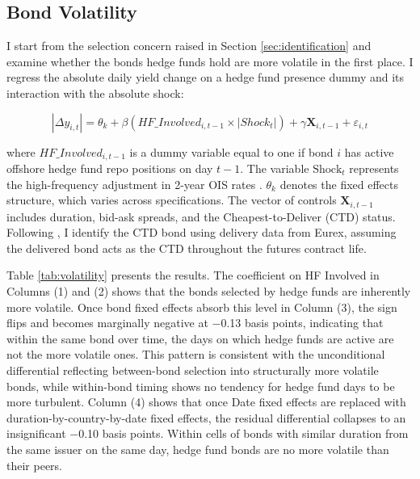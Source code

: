 \documentclass[english, 11pt, oneside]{article}
\begin{document}
\subsection{Bond Volatility}
\label{subsec:volatility}
I start from the selection concern raised in Section \ref{sec:identification} and examine whether the bonds hedge funds hold are more volatile in the first place. I regress the absolute daily yield change on a hedge fund presence dummy and its interaction with the absolute shock:

\begin{equation}
    |\Delta y_{i,t}| = \theta_{k} + \beta (HF\_Involved_{i,t-1} \times |Shock_{t}|) + \gamma \mathbf{X}_{i,t-1} + \varepsilon_{i,t}
\end{equation}

where $HF\_Involved_{i,t-1}$ is a dummy variable equal to one if bond $i$ has active offshore hedge fund repo positions on day $t-1$. The variable $\text{Shock}_{t}$ represents the high-frequency adjustment in 2-year OIS rates \citep{altavilla2019}. $\theta_{k}$ denotes the fixed effects structure, which varies across specifications. The vector of controls $\mathbf{X}_{i,t-1}$ includes duration, bid-ask spreads, and the Cheapest-to-Deliver (CTD) status. Following \citet{pelizzon2025}, I identify the CTD bond using delivery data from Eurex, assuming the delivered bond acts as the CTD throughout the futures contract life.

Table \ref{tab:volatility} presents the results. The coefficient on HF Involved in Columns (1) and (2) shows that the bonds selected by hedge funds are inherently more volatile. Once bond fixed effects absorb this level in Column (3), the sign flips and becomes marginally negative at $-$0.13 basis points, indicating that within the same bond over time, the days on which hedge funds are active are not the more volatile ones. This pattern is consistent with the unconditional differential reflecting between-bond selection into structurally more volatile bonds, while within-bond timing shows no tendency for hedge fund days to be more turbulent. Column (4) shows that once Date fixed effects are replaced with duration-by-country-by-date fixed effects, the residual differential collapses to an insignificant $-$0.10 basis points. Within cells of bonds with similar duration from the same issuer on the same day, hedge fund bonds are no more volatile than their peers.
\end{document}

